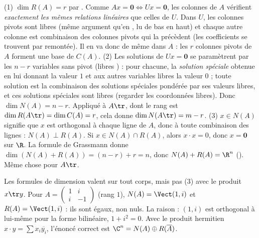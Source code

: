 \begin{preuve}
(1) $\dim R(A)=r$ par . Comme $Ax=\mathbf 0\iff Ux=\mathbf 0$, les colonnes de $A$ vérifient \emph{exactement les mêmes relations linéaires} que celles de $U$. Dans $U$, les colonnes pivots sont libres (même argument qu'en , lu de bas en haut) et chaque autre colonne est combinaison des colonnes pivots qui la précèdent (les coefficients se trouvent par remontée). Il en va donc de même dans $A$ : les $r$ colonnes pivots de $A$ forment une base de $C(A)$.
(2) Les solutions de $Ux=\mathbf 0$ se paramètrent par les $n-r$ variables sans pivot (\og libres \fg) : pour chacune, la \emph{solution spéciale} obtenue en lui donnant la valeur $1$ et aux autres variables libres la valeur $0$ ; toute solution est la combinaison des solutions spéciales pondérée par ses valeurs libres, et ces solutions spéciales sont libres (regarder les coordonnées libres). Donc $\dim N(A)=n-r$. Appliqué à $A\tr$, dont le rang est $\dim R(A\tr)=\dim C(A)=r$, cela donne $\dim N(A\tr)=m-r$.
(3) $x\in N(A)$ signifie que $x$ est orthogonal à chaque ligne de $A$, donc à toute combinaison des lignes : $N(A)\perp R(A)$. Si $x\in N(A)\cap R(A)$, alors $x\cdot x=0$, donc $x=\mathbf 0$ sur $\R$. La formule de Grassmann donne $\dim(N(A)+R(A))=(n-r)+r=n$, donc $N(A)+R(A)=\R^n$ (). Même chose pour $A\tr$.
\end{preuve}
\begin{attention}
Les formules de dimension valent sur tout corps, mais pas (3) avec le produit $x\tr y$. Pour $A=\begin{pmatrix}1&i\\i&-1\end{pmatrix}$ (rang $1$), $N(A)=\Vect(1,i)$ et $R(A)=\Vect(1,i)$ : ils sont égaux, non nuls. La raison : $(1,i)$ est \og orthogonal à lui-même \fg{} pour la forme bilinéaire, $1+i^2=0$. Avec le produit hermitien $x\cdot y=\sum x_i\overline{y_i}$, l'énoncé correct est $\C^n=N(A)\oplus R(\overline A)$.
\end{attention}

